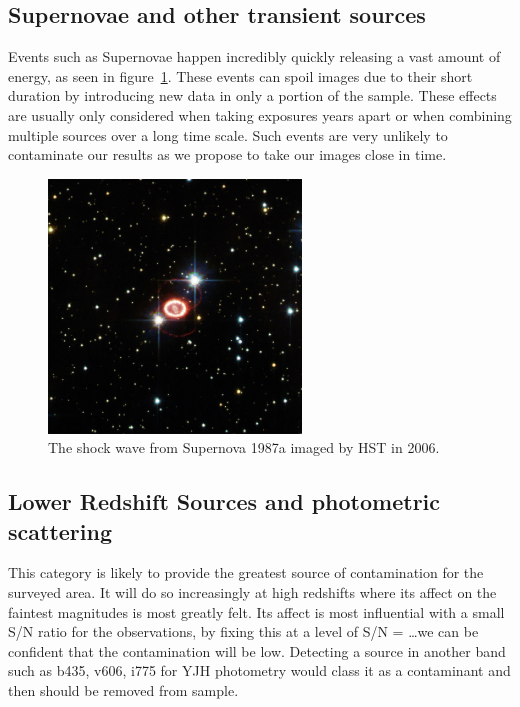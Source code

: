     \subsection{Supernovae and other transient sources} %
    \label{sub:supernovae_and_other_transient_sources}
        Events such as Supernovae happen incredibly quickly releasing a vast amount of energy, as seen in figure~\ref{fig:SNe_1987a}. These events can spoil images due to their short duration by introducing new data in only a portion of the sample. These effects are usually only considered when taking exposures years apart or when combining multiple sources over a long time scale. Such events are very unlikely to contaminate our results as we propose to take our images close in time.
        \begin{figure}[ht]
            \centering
            \includegraphics[width=0.6\textwidth]{../Images/SNe_1987a.jpg}
            \caption{The shock wave from Supernova 1987a imaged by HST in 2006.\label{fig:SNe_1987a}}
        \end{figure}

    \subsection{Lower Redshift Sources and photometric scattering} %
    \label{sub:lower_redshift_sources_and_photometric_scattering}
        This category is likely to provide the greatest source of contamination for the surveyed area. It will do so increasingly at high redshifts where its affect on the faintest magnitudes is most greatly felt. Its affect is most influential with a small S/N ratio for the observations, by fixing this at a level of S/N = \ldots we can be confident that the contamination will be low. Detecting a source in another band such as b435, v606, i775 for YJH photometry would class it as a contaminant and then should be removed from sample.

